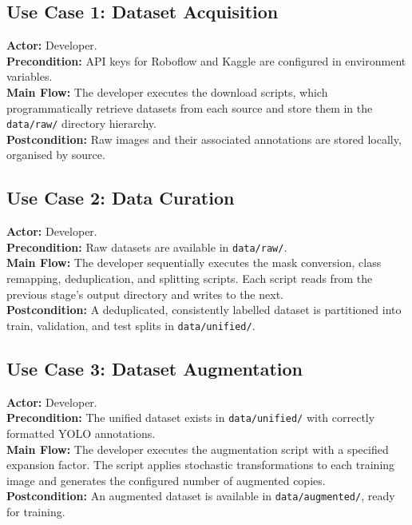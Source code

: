 \documentclass[a4paper,12pt,twoside]{report}
\begin{document}
\subsection{Use Case 1: Dataset Acquisition}

\textbf{Actor:} Developer.\\
\textbf{Precondition:} API keys for Roboflow and Kaggle are configured in
environment variables.\\
\textbf{Main Flow:} The developer executes the download scripts, which
programmatically retrieve datasets from each source and store them in the
\texttt{data/raw/} directory hierarchy.\\
\textbf{Postcondition:} Raw images and their associated annotations are stored
locally, organised by source.

\subsection{Use Case 2: Data Curation}

\textbf{Actor:} Developer.\\
\textbf{Precondition:} Raw datasets are available in \texttt{data/raw/}.\\
\textbf{Main Flow:} The developer sequentially executes the mask conversion,
class remapping, deduplication, and splitting scripts. Each script reads from
the previous stage's output directory and writes to the next.\\
\textbf{Postcondition:} A deduplicated, consistently labelled dataset is
partitioned into train, validation, and test splits in \texttt{data/unified/}.

\subsection{Use Case 3: Dataset Augmentation}

\textbf{Actor:} Developer.\\
\textbf{Precondition:} The unified dataset exists in \texttt{data/unified/} with
correctly formatted YOLO annotations.\\
\textbf{Main Flow:} The developer executes the augmentation script with a
specified expansion factor. The script applies stochastic transformations to each
training image and generates the configured number of augmented copies.\\
\textbf{Postcondition:} An augmented dataset is available in
\texttt{data/augmented/}, ready for training.
\end{document}
